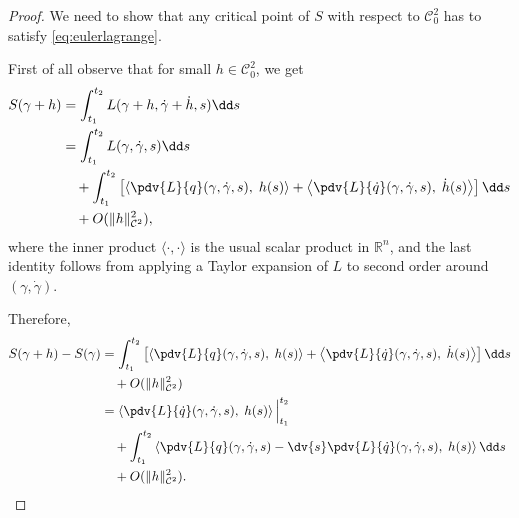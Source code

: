 \documentclass[english,fontsize=11pt,paper=b5]{scrbook}
\numberwithin{equation}{chapter}
\theoremstyle{definition}
\begin{document}
  \begin{proof}
    We need to show that any critical point of $S$ with respect to $\mathcal{C}^2_0$ has to satisfy \eqref{eq:eulerlagrange}.

    First of all observe that for small $h\in \mathcal{C}^2_0$, we get
    \begin{align}
      S(\gamma + h) &= \int_{t_1}^{t_2} L(\gamma + h, \dot \gamma + \dot h, s) \dd s \\
                    &= \int_{t_1}^{t_2} %
                    L(\gamma, \dot \gamma, s) \dd s \\
                    &\quad + \int_{t_1}^{t_2} \left[
                      \left\langle
                        \pdv{L}{q}(\gamma, \dot \gamma, s),\;
                        h(s)
                      \right\rangle
                      + \left\langle
                        \pdv{L}{\dot q}(\gamma, \dot \gamma, s),\;
                        \dot h(s)
                      \right\rangle
                    \right] \dd s \\
                    &\quad + O(\|h\|^2_{\mathcal{C}^2}),
    \end{align}
    where the inner product $\langle\cdot,\cdot\rangle$ is the usual scalar product in $\mathbb{R}^n$, and the last identity follows from applying a Taylor expansion of $L$ to second order around $(\gamma, \dot \gamma)$.

    Therefore,
    \begin{align}
      S(\gamma+h) - S(\gamma) &= \int_{t_1}^{t_2} \left[
        \left\langle\pdv{L}{q}(\gamma, \dot \gamma, s),\; h(s)\right\rangle
        + \left\langle\pdv{L}{\dot q}(\gamma, \dot \gamma, s),\; \dot h(s)\right\rangle
      \right] \dd s\\
                              &\quad + O(\|h\|^2_{\mathcal{C}^2})\\
                              &= \left\langle\pdv{L}{\dot q}(\gamma, \dot \gamma, s),\; h(s)\right\rangle \Big|_{t_1}^{t_2} \\
                              &\quad + \int_{t_1}^{t_2} \left\langle
                                \pdv{L}{q}(\gamma, \dot \gamma, s)
                                - \dv{s}\pdv{L}{\dot q}(\gamma, \dot \gamma, s)
                              ,\; h(s)\right\rangle \dd s\\
                              &\quad + O(\|h\|^2_{\mathcal{C}^2}).
      \end{align}


\end{proof}
\end{document}
